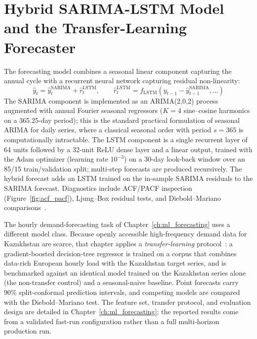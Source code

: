\section{Hybrid SARIMA-LSTM Model and the Transfer-Learning Forecaster}
\label{sec:method_sarimalstm}

The forecasting model combines a seasonal linear component capturing the annual cycle with a recurrent neural network capturing residual non-linearity:
\begin{equation}
    \hat{y}_t = \hat{y}^{\text{SARIMA}}_t + \hat{r}^{\text{LSTM}}_t, \qquad \hat{r}^{\text{LSTM}}_t = f_{\text{LSTM}}\left(y_{t-1} - \hat{y}^{\text{SARIMA}}_{t-1}, \ldots\right)
\end{equation}
The SARIMA component is implemented as an ARIMA(2,0,2) process augmented with annual Fourier seasonal regressors ($K = 4$ sine--cosine harmonics on a 365.25-day period); this is the standard practical formulation of seasonal ARIMA for daily series, where a classical seasonal order with period $s = 365$ is computationally intractable. The LSTM component is a single recurrent layer of 64 units followed by a 32-unit ReLU dense layer and a linear output, trained with the Adam optimizer (learning rate $10^{-3}$) on a 30-day look-back window over an 85/15 train/validation split; multi-step forecasts are produced recursively. The hybrid forecast adds an LSTM trained on the in-sample SARIMA residuals to the SARIMA forecast. Diagnostics include ACF/PACF inspection (Figure~\ref{fig:acf_pacf}), Ljung--Box residual tests, and Diebold--Mariano comparisons~\cite{dieboldmariano1995, hochreiter1997, hewamalage2021}.

The hourly demand-forecasting task of Chapter~\ref{ch:ml_forecasting} uses a different model class. Because openly accessible high-frequency demand data for Kazakhstan are scarce, that chapter applies a \emph{transfer-learning} protocol~\cite{pan2010transfer, cai2020transfer}: a gradient-boosted decision-tree regressor is trained on a corpus that combines data-rich European hourly load with the Kazakhstan target series, and is benchmarked against an identical model trained on the Kazakhstan series alone (the non-transfer control) and a seasonal-naive baseline. Point forecasts carry 90\% split-conformal prediction intervals, and competing models are compared with the Diebold--Mariano test. The feature set, transfer protocol, and evaluation design are detailed in Chapter~\ref{ch:ml_forecasting}; the reported results come from a validated fast-run configuration rather than a full multi-horizon production run.

